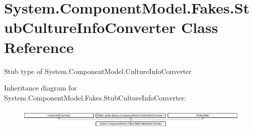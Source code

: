 \hypertarget{class_system_1_1_component_model_1_1_fakes_1_1_stub_culture_info_converter}{\section{System.\-Component\-Model.\-Fakes.\-Stub\-Culture\-Info\-Converter Class Reference}
\label{class_system_1_1_component_model_1_1_fakes_1_1_stub_culture_info_converter}
}


Stub type of System.\-Component\-Model.\-Culture\-Info\-Converter 


Inheritance diagram for System.\-Component\-Model.\-Fakes.\-Stub\-Culture\-Info\-Converter\-:\begin{figure}[H]
\begin{center}
\leavevmode
\includegraphics[height=0.995556cm]{class_system_1_1_component_model_1_1_fakes_1_1_stub_culture_info_converter}
\end{center}
\end{figure}
